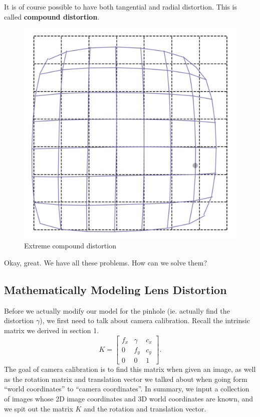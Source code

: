 \documentclass{article}
\begin{document}
\newpage

It is of course possible to have both tangential and radial distortion. This is called \textbf{compound distortion}.

\begin{figure}[h]
    \centering
    \includegraphics[scale=0.1]{IMG_1108.jpeg}
    \caption{Extreme compound distortion}
    \label{l}
\end{figure}
Okay, great. We have all these problems. How can we solve them?

\subsection{Mathematically Modeling Lens Distortion}

Before we actually modify our model for the pinhole (ie. actually find the distortion $\gamma$), we first need to talk about camera calibration. Recall the intrinsic matrix we derived in section 1. 
\[
K = \begin{bmatrix}
    f_x & \gamma & c_x \\ 0 & f_y & c_y \\ 0 & 0 & 1
\end{bmatrix}
.\] The goal of camera calibration is to find this matrix when given an image, as well as the rotation matrix and translation vector we talked about when going form ``world coordinates'' to ``camera coordinates''. In summary, we input a collection of images whose 2D image coordinates and 3D world coordinates are known, and we spit out the matrix $K$ and the rotation and translation vector. 
\end{document}
